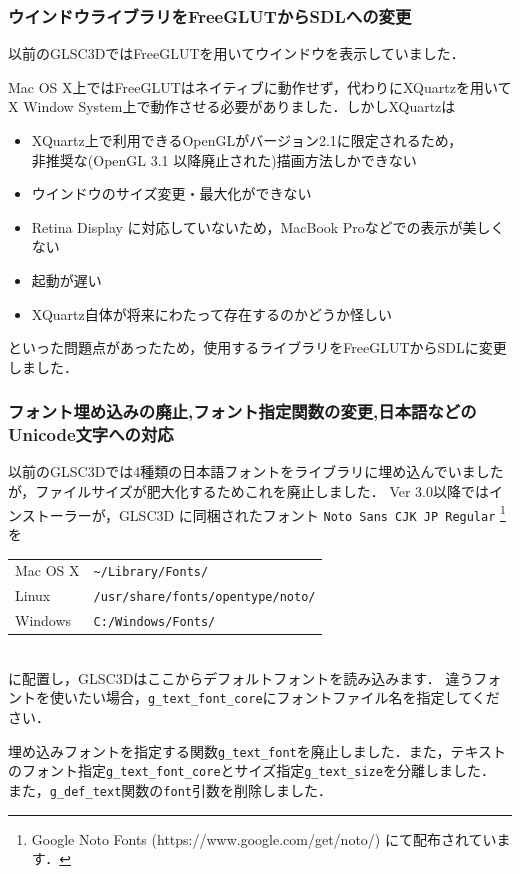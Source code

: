 \documentclass[platex,a4paper,12pt]{jsarticle}%
\begin{document}
\subsubsection{ウインドウライブラリをFreeGLUTからSDLへの変更}
以前のGLSC3DではFreeGLUTを用いてウインドウを表示していました．

Mac OS X上ではFreeGLUTはネイティブに動作せず，代わりにXQuartzを用いてX Window System上で動作させる必要がありました．しかしXQuartzは
\begin{itemize}
	\item XQuartz上で利用できるOpenGLがバージョン2.1に限定されるため，\\非推奨な(OpenGL 3.1 以降廃止された)描画方法しかできない
	\item ウインドウのサイズ変更・最大化ができない
	\item Retina Display に対応していないため，MacBook Proなどでの表示が美しくない
	\item 起動が遅い
	\item XQuartz自体が将来にわたって存在するのかどうか怪しい
\end{itemize}
といった問題点があったため，使用するライブラリをFreeGLUTからSDLに変更しました．

\subsubsection{フォント埋め込みの廃止,フォント指定関数の変更,日本語などのUnicode文字への対応}
以前のGLSC3Dでは4種類の日本語フォントをライブラリに埋め込んでいましたが，ファイルサイズが肥大化するためこれを廃止しました．
Ver 3.0以降ではインストーラーが，GLSC3D に同梱されたフォント \verb|Noto Sans CJK JP Regular|
\footnote{Google Noto Fonts (https://www.google.com/get/noto/) にて配布されています．} を
\begin{table}[h]
	\centering
	\begin{tabular}{ll}
		Mac OS X & \verb|~/Library/Fonts/|\\
		Linux & \verb|/usr/share/fonts/opentype/noto/|\\
		Windows & \verb|C:/Windows/Fonts/|\\
	\end{tabular}
\end{table}\\
に配置し，GLSC3Dはここからデフォルトフォントを読み込みます．
違うフォントを使いたい場合，\verb|g_text_font_core|にフォントファイル名を指定してください．

\newpage
埋め込みフォントを指定する関数\verb|g_text_font|を廃止しました．また，テキストのフォント指定\verb|g_text_font_core|とサイズ指定\verb|g_text_size|を分離しました．
また，\verb|g_def_text|関数の\verb|font|引数を削除しました．
\end{document}
